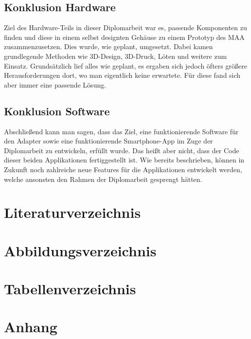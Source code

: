 \documentclass[11pt, twoside]{article}
\renewcommand{\listfigurename}{Abbildungen}
\begin{document}
\subsection{Konklusion Hardware}
Ziel des Hardware-Teils in dieser Diplomarbeit war es, passende Komponenten zu finden und diese in einem selbst designten Gehäuse zu einem Prototyp des MAA zusammenzusetzen. Dies wurde, wie geplant, umgesetzt. Dabei kamen grundlegende Methoden wie 3D-Design, 3D-Druck, Löten und weitere zum Einsatz. Grundsätzlich lief alles wie geplant, es ergaben sich jedoch öfters größere Herausforderungen dort, wo man eigentlich keine erwartete. Für diese fand sich aber immer eine passende Lösung.
\subsection{Konklusion Software}
Abschließend kann man sagen, dass das Ziel, eine funktionierende Software für den Adapter sowie eine funktionierende Smartphone-App im Zuge der Diplomarbeit zu entwickeln, erfüllt wurde. Das heißt aber nicht, dass der Code dieser beiden Applikationen fertiggestellt ist. Wie bereits beschrieben, können in Zukunft noch zahlreiche neue Features für die Applikationen entwickelt werden, welche ansonsten den Rahmen der Diplomarbeit gesprengt hätten.
\newpage
{}
\setcounter{page}{3} %
\fancyhead{} %
\renewcommand{\headrulewidth}{0pt}  %
\section*{Literaturverzeichnis}
\fancyfoot[LO, RE]{} %
\printbibliography[heading=none]
\newpage
\section*{Abbildungsverzeichnis}
\renewcommand{\listfigurename}{\hspace{-1cm}} %
\vspace{-3em}
\listoffigures
\section*{Tabellenverzeichnis}
\renewcommand{\listtablename}{\hspace{-1cm}} %
\vspace{-3em}
\listoftables
\section*{Anhang}
\end{document}
